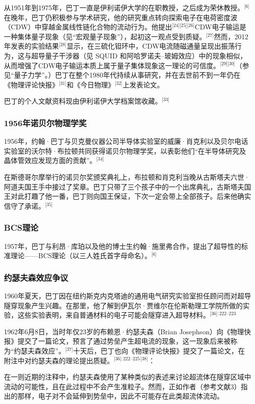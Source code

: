 从1951年到1975年，巴丁一直是伊利诺伊大学的在职教授，之后成为荣休教授。\(^\text{[6]}\)在晚年，巴丁仍积极参与学术研究，他的研究重点转向探索电子在电荷密度波（CDW）中穿越金属线性链化合物的流动行为。他提出\(^\text{[24][25][26]}\)CDW电子输运是一种集体量子现象（见“宏观量子现象”），起初这一观点受到质疑。\(^\text{[27]}\)然而，2012年发表的实验结果\(^\text{[28]}\)显示，在三硫化钽环中，CDW电流随磁通量呈现出振荡行为，这与超导量子干涉器（见 SQUID 和阿哈罗诺夫–玻姆效应）中的现象相似，从而增强了CDW电子输运本质上属于量子集体现象这一理论的可信度。\(^\text{[29][30]}\)（参见“量子力学”。）巴丁在整个1980年代持续从事研究，并在去世前不到一年仍在《物理评论快报》\(^\text{[31]}\)和《今日物理》\(^\text{[32]}\)上发表论文。

巴丁的个人文献资料现由伊利诺伊大学档案馆收藏。\(^\text{[33]}\)
\subsubsection{1956年诺贝尔物理学奖}
1956年，约翰·巴丁与贝克曼仪器公司半导体实验室的威廉·肖克利以及贝尔电话实验室的沃尔特·布拉顿共同获得诺贝尔物理学奖，以表彰他们“在半导体研究及晶体管效应发现方面的贡献”。\(^\text{[34]}\)

在斯德哥尔摩举行的诺贝尔奖颁奖典礼上，布拉顿和肖克利当晚从古斯塔夫六世·阿道夫国王手中接过了奖章。巴丁只带了三个孩子中的一个出席典礼，古斯塔夫国王对此打趣了他一番，巴丁则向国王保证，下次一定会带上全部孩子。后来他确实信守了承诺。\(^\text{[35]}\)
\subsubsection{BCS理论}
1957年，巴丁与利昂·库珀以及他的博士生约翰·施里弗合作，提出了超导性的标准理论——BCS理论（以三人姓氏首字母命名）。\(^\text{[6]}\)
\subsubsection{约瑟夫森效应争议}
1960年夏天，巴丁因在纽约斯克内克塔迪的通用电气研究实验室担任顾问而对超导隧穿现象产生兴趣。在那里，他了解到伊瓦尔·贾维尔在伦斯勒理工学院所做的实验，这些实验表明，来自普通材料的电子可能会隧穿进入超导材料。\(^\text{[36]: 222–223 }\)

1962年6月8日，当时年仅23岁的布赖恩·约瑟夫森（Brian Josephson）向《物理快报》提交了一篇论文，预言了通过势垒产生超电流的现象，这一现象后来被称为“约瑟夫森效应”。\(^\text{[37]}\)十天后，巴丁也向《物理评论快报》提交了一篇论文，在附注中对约瑟夫森的理论提出质疑。\(^\text{[36]: 222–225 [38]}\)：

在一则近期的注释中，约瑟夫森使用了某种类似的表述来讨论超流体在隧穿区域中流动的可能性，且在此过程中不会产生准粒子。然而，正如作者（参考文献3）指出的那样，电子对不会延伸到势垒中，因此不可能存在此类超流体流动。

